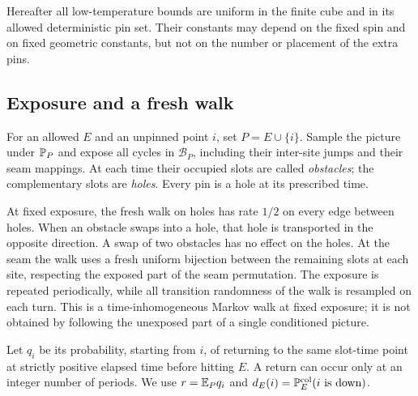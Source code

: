 Hereafter all low-temperature bounds are uniform in the finite cube and
in its allowed deterministic pin set.  Their constants may depend on
the fixed spin and on fixed geometric constants, but not on the number
or placement of the extra pins.

\subsection{Exposure and a fresh walk}

For an allowed $E$ and an unpinned point $i$, set $P=E\cup\{i\}$.
Sample the picture under $\mathbb P_P$ and expose all cycles in $\mathcal B_P$,
including their inter-site jumps and their seam mappings.  At each time
their occupied slots are called \emph{obstacles}; the complementary slots
are \emph{holes}.  Every pin is a hole at its prescribed time.

At fixed exposure, the fresh walk on holes has rate $1/2$ on every edge
between holes.  When an obstacle swaps into a hole, that hole is
transported in the opposite direction.  A swap of two obstacles has no
effect on the holes.  At the seam the walk uses a fresh uniform bijection
between the remaining slots at each site, respecting the exposed part of
the seam permutation.  The exposure is repeated periodically, while all
transition randomness of the walk is resampled on each turn.  This is
a time-inhomogeneous Markov walk at fixed exposure; it is not obtained
by following the unexposed part of a single conditioned picture.

Let $q_i$ be its probability, starting from $i$, of returning to the
same slot-time point at strictly positive elapsed time before hitting
$E$.  A return can occur only at an integer number of periods.  We use
$r=\mathbb E_Pq_i$ and $d_E(i)=\mathbb P_E^{\mathrm{col}}(i\text{ is down})$.

